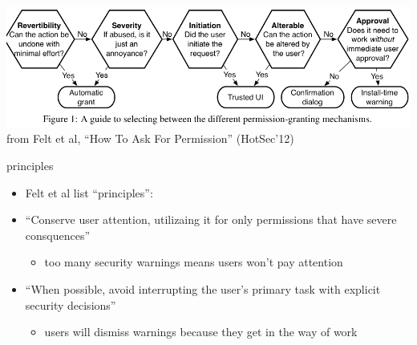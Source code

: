 \begin{frame}
\includegraphics[width=\textwidth]{../sandbox/app-perm-how}
\scriptsize from Felt et al, ``How To Ask For Permission'' (HotSec'12)
\end{frame}

\begin{frame}{principles}
    \begin{itemize}
    \item Felt et al list ``principles'':
    \vspace{.5cm}
    \item ``Conserve user attention, utilizaing it for only permissions that have severe consquences''
        \begin{itemize}
        \item too many security warnings means users won't pay attention
        \end{itemize}
    \item ``When possible, avoid interrupting the user's primary task with explicit security decisions''
        \begin{itemize}
        \item users will dismiss warnings because they get in the way of work
        \end{itemize}
    \end{itemize}
\end{frame}
